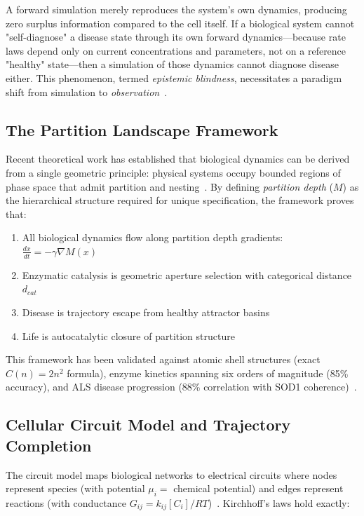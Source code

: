 \documentclass[12pt,a4paper]{article}
\begin{document}
A forward simulation merely reproduces the system's own dynamics, producing zero surplus information compared to the cell itself. If a biological system cannot "self-diagnose" a disease state through its own forward dynamics—because rate laws depend only on current concentrations and parameters, not on a reference "healthy" state—then a simulation of those dynamics cannot diagnose disease either. This phenomenon, termed \textit{epistemic blindness}, necessitates a paradigm shift from simulation to \textit{observation}~\cite{sachikonye2026sbs}.

\subsection{The Partition Landscape Framework}

Recent theoretical work has established that biological dynamics can be derived from a single geometric principle: physical systems occupy bounded regions of phase space that admit partition and nesting~\cite{sachikonye2026partition}. By defining \textit{partition depth} ($M$) as the hierarchical structure required for unique specification, the framework proves that:

\begin{enumerate}
    \item All biological dynamics flow along partition depth gradients: $\frac{dx}{dt} = -\gamma \nabla M(x)$
    \item Enzymatic catalysis is geometric aperture selection with categorical distance $d_{cat}$
    \item Disease is trajectory escape from healthy attractor basins
    \item Life is autocatalytic closure of partition structure
\end{enumerate}

This framework has been validated against atomic shell structures (exact $C(n) = 2n^2$ formula), enzyme kinetics spanning six orders of magnitude (85\% accuracy), and ALS disease progression (88\% correlation with SOD1 coherence)~\cite{sachikonye2026partition}.

\subsection{Cellular Circuit Model and Trajectory Completion}

The circuit model maps biological networks to electrical circuits where nodes represent species (with potential $\mu_i =$ chemical potential) and edges represent reactions (with conductance $G_{ij} = k_{ij}[C_i]/RT$)~\cite{sachikonye2026cellular}. Kirchhoff's laws hold exactly:
\end{document}
